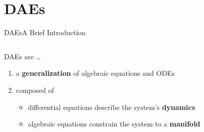 
\section{\aclp{DAE}}

\begin{frame}{\aclp{DAE}}{A Brief Introduction}
  \begin{columns}
    \begin{column}{0.65\textwidth}
      \acsp{DAE} are \dots
      \begin{enumerate}[<+->]
        \item a \textbf{generalization} of algebraic equations and \acsp{ODE} \\
        \item composed of
        \begin{itemize}
          \item<2-> differential equations describe the system's \textbf{dynamics}
          \item<2-> algebraic equations constrain the system to a \textbf{manifold} \\
        \end{itemize}
      \end{enumerate}
    \end{column}
    \begin{column}{0.35\textwidth}

\end{column}
\end{columns}
\end{frame}
